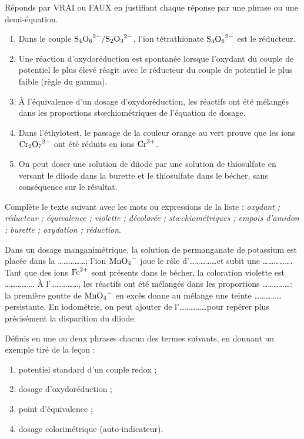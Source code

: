 \documentclass[11pt]{article}
\begin{document}
\begin{exercice}
Réponds par VRAI ou FAUX en justifiant chaque réponse par une phrase ou une demi-équation.
\begin{enumerate}
\item Dans le couple $\ce{S4O6^2-}/\ce{S2O3^2-}$, l'ion tétrathionate $\ce{S4O6^2-}$ est le réducteur.
\item Une réaction d'oxydoréduction est spontanée lorsque l'oxydant du couple de potentiel le plus élevé réagit avec le réducteur du couple de potentiel le plus faible (règle du gamma).
\item À l'équivalence d'un dosage d'oxydoréduction, les réactifs ont été mélangés dans les proportions stœchiométriques de l'équation de dosage.
\item Dans l'éthylotest, le passage de la couleur orange au vert prouve que les ions $\ce{Cr2O7^2-}$ ont été réduits en ions $\ce{Cr^3+}$.
\item On peut doser une solution de diiode par une solution de thiosulfate en versant le diiode dans la burette et le thiosulfate dans le bécher, sans conséquence sur le résultat.
\end{enumerate}
\end{exercice}

\begin{exercice}
Complète le texte suivant avec les mots ou expressions de la liste : \emph{oxydant ; réducteur ; équivalence ; violette ; décolorée ; stœchiométriques ; empois d'amidon ; burette ; oxydation ; réduction}.

\medskip
Dans un dosage manganimétrique, la solution de permanganate de potassium est placée dans la \ldots\ldots\ldots\ldots\ldots ; l'ion $\ce{MnO4-}$ joue le rôle d'\ldots\ldots\ldots\ldots\ldots et subit une \ldots\ldots\ldots\ldots\ldots. Tant que des ions $\ce{Fe^2+}$ sont présents dans le bécher, la coloration violette est \ldots\ldots\ldots\ldots\ldots. À l'\ldots\ldots\ldots\ldots\ldots, les réactifs ont été mélangés dans les proportions \ldots\ldots\ldots\ldots\ldots : la première goutte de $\ce{MnO4-}$ en excès donne au mélange une teinte \ldots\ldots\ldots\ldots\ldots persistante. En iodométrie, on peut ajouter de l'\ldots\ldots\ldots\ldots\ldots pour repérer plus précisément la disparition du diiode.
\end{exercice}

\begin{exercice}[Définitions]
Définis en une ou deux phrases chacun des termes suivants, en donnant un exemple tiré de la leçon :
\begin{enumerate}
\item potentiel standard d'un couple redox ;
\item dosage d'oxydoréduction ;
\item point d'équivalence ;
\item dosage colorimétrique (auto-indicateur).
\end{enumerate}
\end{exercice}
\end{document}
